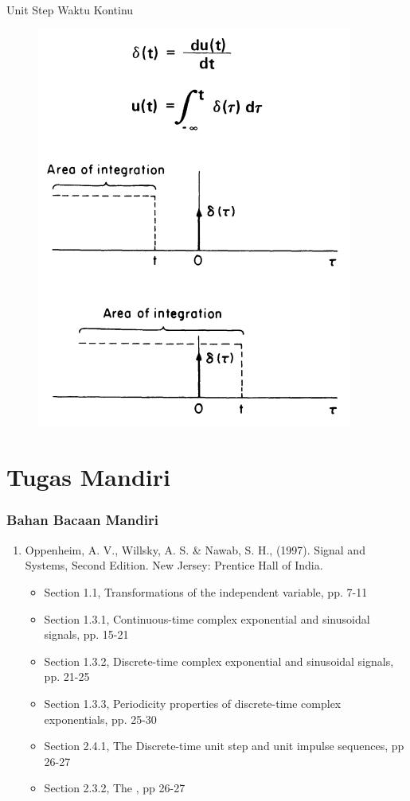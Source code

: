 \documentclass[pdflatex,compress,mathserif]{beamer}
\begin{document}
\begin{frame}{Unit Step Waktu Kontinu}
	\begin{figure}
		\centering
		\includegraphics[height=0.8\textheight]{img/02.slide_08}
	\end{figure}
\end{frame}

\section{Tugas Mandiri}

\begin{frame}
	\frametitle{Bahan Bacaan Mandiri}
	\begin{enumerate}
		\item Oppenheim, A. V., Willsky, A. S. \& Nawab, S. H., (1997). Signal and Systems, Second Edition. New Jersey: Prentice Hall of India.
		\begin{itemize}
			\item Section 1.1, Transformations of the independent variable, pp. 7-11
			\item Section 1.3.1, Continuous-time complex exponential and sinusoidal signals, pp. 15-21
			\item Section 1.3.2, Discrete-time complex exponential and sinusoidal signals, pp. 21-25
			\item Section 1.3.3, Periodicity properties of discrete-time complex exponentials, pp. 25-30
			\item Section 2.4.1, The Discrete-time unit step and unit impulse sequences, pp 26-27
			\item Section 2.3.2, The , pp 26-27
		\end{itemize}
	\end{enumerate}
\end{frame}
\end{document}

